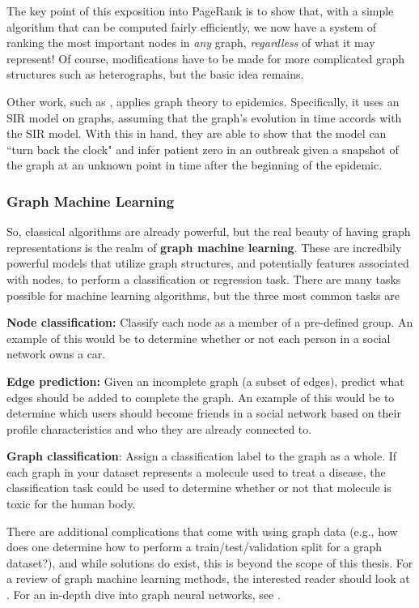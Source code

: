 \documentclass{article}
\theoremstyle{definition}
\begin{document}
The key point of this exposition into PageRank is to show that, with a simple algorithm that can be computed fairly efficiently, we now have a system of ranking the most important nodes in \textit{any} graph, \textit{regardless} of what it may represent! Of course, modifications have to be made for more complicated graph structures such as heterographs, but the basic idea remains.

Other work, such as \cite{PhysRevLetterBayesianInferenceNetworksBeliefProp}, applies graph theory to epidemics. Specifically, it uses an SIR model \cite{SIRmodel} on graphs, assuming that the graph's evolution in time accords with the SIR model. With this in hand, they are able to show that the model can ``turn back the clock" and infer patient zero in an outbreak given a snapshot of the graph at an unknown point in time after the beginning of the epidemic.

\subsubsection{Graph Machine Learning}

So, classical algorithms are already powerful, but the real beauty of having graph representations is the realm of \textbf{graph machine learning}. These are incredbily powerful models that utilize graph structures, and potentially features associated with nodes, to perform a classification or regression task. There are many tasks possible for machine learning algorithms, but the three most common tasks are

\textbf{Node classification:} Classify each node as a member of a pre-defined group. An example of this would be to determine whether or not each person in a social network owns a car.

\textbf{Edge prediction:} Given an incomplete graph (a subset of edges), predict what edges should be added to complete the graph. An example of this would be to determine which users should become friends in a social network based on their profile characteristics and who they are already connected to.

\textbf{Graph classification}: Assign a classification label to the graph as a whole. If each graph in your dataset represents a molecule used to treat a disease, the classification task could be used to determine whether or not that molecule is toxic for the human body.

There are additional complications that come with using graph data (e.g., how does one determine how to perform a train/test/validation split for a graph dataset?), and while solutions do exist, this is beyond the scope of this thesis. For a review of graph machine learning methods, the interested reader should look at \cite{graphMLSurvey}. For an in-depth dive into graph neural networks, see \cite{GNNsurvey}.
\end{document}
